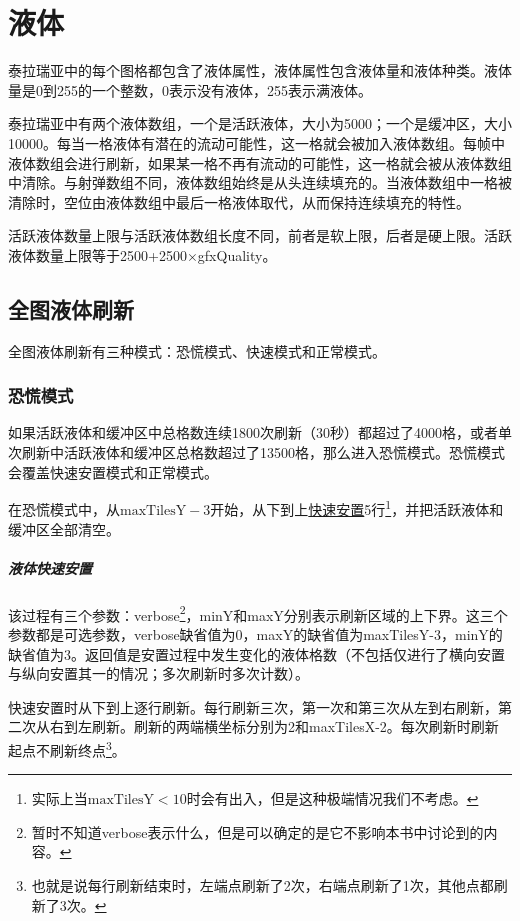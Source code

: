 \chapter{液体}\label{app23}

泰拉瑞亚中的每个图格都包含了液体属性，液体属性包含液体量和液体种类。液体量是0到255的一个整数，0表示没有液体，255表示满液体。

泰拉瑞亚中有两个液体数组，一个是活跃液体，大小为5000；一个是缓冲区，大小10000。每当一格液体有潜在的流动可能性，这一格就会被加入液体数组。每帧中液体数组会进行刷新，如果某一格不再有流动的可能性，这一格就会被从液体数组中清除。与射弹数组不同，液体数组始终是从头连续填充的。当液体数组中一格被清除时，空位由液体数组中最后一格液体取代，从而保持连续填充的特性。

活跃液体数量上限与活跃液体数组长度不同，前者是软上限，后者是硬上限。活跃液体数量上限等于2500+2500$\times$gfxQuality。

\section{全图液体刷新}
全图液体刷新有三种模式：恐慌模式、快速模式和正常模式。

\subsection{恐慌模式}
如果活跃液体和缓冲区中总格数连续1800次刷新（30秒）都超过了4000格，或者单次刷新中活跃液体和缓冲区总格数超过了13500格，那么进入恐慌模式。恐慌模式会覆盖快速安置模式和正常模式。

在恐慌模式中，从$\textrm{maxTilesY}-3$开始，从下到上\hyperref[app30]{快速安置}5行\footnote{实际上当$\textrm{maxTilesY}<10$时会有出入，但是这种极端情况我们不考虑。}，并把活跃液体和缓冲区全部清空。

\paragraph*{液体快速安置}\label{app30}
该过程有三个参数：verbose\footnote{暂时不知道verbose表示什么，但是可以确定的是它不影响本书中讨论到的内容。}，minY和maxY分别表示刷新区域的上下界。这三个参数都是可选参数，verbose缺省值为0，maxY的缺省值为maxTilesY-3，minY的缺省值为3。返回值是安置过程中发生变化的液体格数（不包括仅进行了横向安置与纵向安置其一的情况；多次刷新时多次计数）。

快速安置时从下到上逐行刷新。每行刷新三次，第一次和第三次从左到右刷新，第二次从右到左刷新。刷新的两端横坐标分别为2和maxTilesX-2。每次刷新时刷新起点不刷新终点\footnote{也就是说每行刷新结束时，左端点刷新了2次，右端点刷新了1次，其他点都刷新了3次。}。

